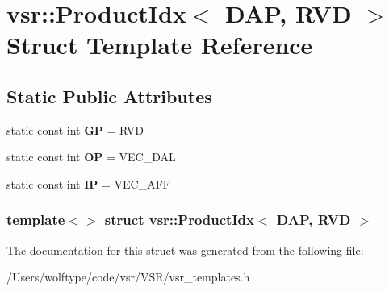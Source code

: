 \hypertarget{structvsr_1_1_product_idx_3_01_d_a_p_00_01_r_v_d_01_4}{\section{vsr\-:\-:Product\-Idx$<$ D\-A\-P, R\-V\-D $>$ Struct Template Reference}
\label{structvsr_1_1_product_idx_3_01_d_a_p_00_01_r_v_d_01_4}
}
\subsection*{Static Public Attributes}
\begin{DoxyCompactItemize}
\item 
\hypertarget{structvsr_1_1_product_idx_3_01_d_a_p_00_01_r_v_d_01_4_ab0cd3c150f95a12f560e1f61b85ce198}{static const int {\bfseries G\-P} = R\-V\-D}\label{structvsr_1_1_product_idx_3_01_d_a_p_00_01_r_v_d_01_4_ab0cd3c150f95a12f560e1f61b85ce198}

\item 
\hypertarget{structvsr_1_1_product_idx_3_01_d_a_p_00_01_r_v_d_01_4_a955c1f9aa6b34adc34b0f491886effcd}{static const int {\bfseries O\-P} = V\-E\-C\-\_\-\-D\-A\-L}\label{structvsr_1_1_product_idx_3_01_d_a_p_00_01_r_v_d_01_4_a955c1f9aa6b34adc34b0f491886effcd}

\item 
\hypertarget{structvsr_1_1_product_idx_3_01_d_a_p_00_01_r_v_d_01_4_a17fa5ffd747f7aa072b68cad0c3d99eb}{static const int {\bfseries I\-P} = V\-E\-C\-\_\-\-A\-F\-F}\label{structvsr_1_1_product_idx_3_01_d_a_p_00_01_r_v_d_01_4_a17fa5ffd747f7aa072b68cad0c3d99eb}

\end{DoxyCompactItemize}
\subsubsection*{template$<$$>$ struct vsr\-::\-Product\-Idx$<$ D\-A\-P, R\-V\-D $>$}



The documentation for this struct was generated from the following file\-:\begin{DoxyCompactItemize}
\item 
/\-Users/wolftype/code/vsr/\-V\-S\-R/vsr\-\_\-templates.\-h\end{DoxyCompactItemize}
